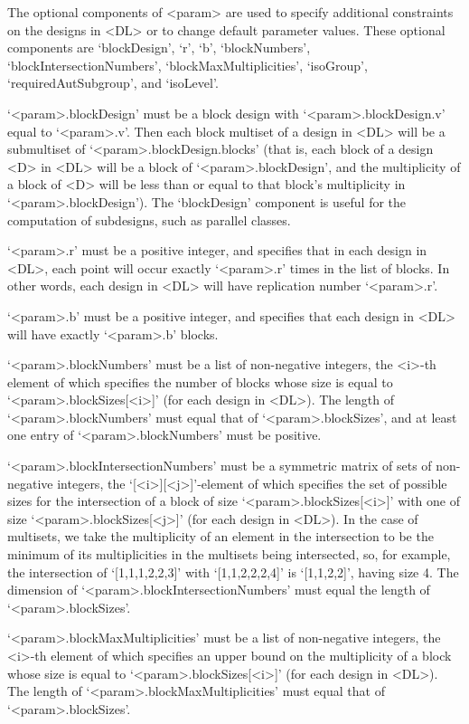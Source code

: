 The optional components of <param> are used to specify additional
constraints on the designs in <DL> or to change default parameter
values. These optional components are `blockDesign', `r', `b',
`blockNumbers', `blockIntersectionNumbers', `blockMaxMultiplicities',
`isoGroup', `requiredAutSubgroup', and `isoLevel'.

`<param>.blockDesign' must  be a block design with `<param>.blockDesign.v'
equal to `<param>.v'. Then each block multiset of a design in <DL> will
be a submultiset of `<param>.blockDesign.blocks' (that is, each block of
a design <D> in <DL> will be a block of `<param>.blockDesign', and the
multiplicity of a block of <D> will be less than or equal to that block's
multiplicity in `<param>.blockDesign'). The `blockDesign' component is
useful for the computation of subdesigns, such as parallel classes.

`<param>.r' must be a positive integer, and specifies that in each design
in <DL>, each point will occur exactly `<param>.r' times in the list of
blocks. In other words, each design in <DL> will have replication number
`<param>.r'.

`<param>.b' must be a positive integer, and specifies that each design
in <DL> will have exactly `<param>.b' blocks.

`<param>.blockNumbers' must be a list of non-negative integers, the <i>-th
element of which specifies the number of blocks whose size is equal
to `<param>.blockSizes[<i>]' (for each design in <DL>). The length of
`<param>.blockNumbers' must equal that of `<param>.blockSizes', and at
least one entry of `<param>.blockNumbers' must be positive.

`<param>.blockIntersectionNumbers' must be a symmetric matrix of sets
of non-negative integers, the `[<i>][<j>]'-element of which specifies
the set of possible sizes for the intersection of a block of size
`<param>.blockSizes[<i>]' with one of size `<param>.blockSizes[<j>]' (for
each design in <DL>). In the case of multisets, we take the multiplicity
of an element in the intersection to be the minimum of its multiplicities
in the multisets being intersected, so, for example, the intersection of
`[1,1,1,2,2,3]' with `[1,1,2,2,2,4]' is `[1,1,2,2]', having size 4. The
dimension of `<param>.blockIntersectionNumbers' must equal the length of
`<param>.blockSizes'.

`<param>.blockMaxMultiplicities' must be a list of non-negative integers,
the <i>-th element of which specifies an upper bound on the multiplicity
of a block whose size is equal to `<param>.blockSizes[<i>]' (for each
design in <DL>). The length of `<param>.blockMaxMultiplicities' must
equal that of `<param>.blockSizes'.


